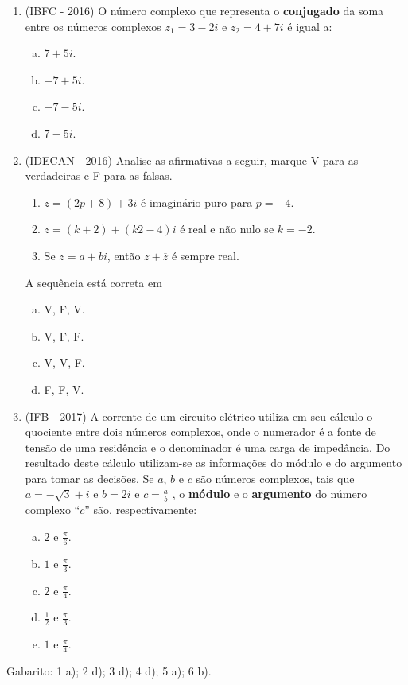 \begin{enumerate}
  \item (IBFC - 2016) O número complexo que representa o \textbf{conjugado} da soma entre os números complexos $z_1= 3 - 2i$ e $z_2 = 4 + 7i$ é igual a:
  \begin{enumerate}[a)]
  \item $7+5i$.
  \item $-7+5i$.
  \item $-7-5i$.
  \item $7-5i$.
  \end{enumerate}

  \item (IDECAN - 2016) Analise as afirmativas a seguir, marque V para as verdadeiras e F para as falsas.

   \begin{enumerate}[( \ \ )]
  \item $z = (2p + 8) + 3i$ é imaginário puro para $p = -4$.
  \item $z = (k + 2) + (k2 - 4)i$ é real e não nulo se $k = -2$.
  \item Se $z = a + bi$, então $z + \overline{z}$ é sempre real.
  \end{enumerate}
  A sequência está correta em
  \begin{enumerate}[a)]
  \item V, F, V.
  \item V, F, F.
  \item V, V, F.
  \item F, F, V.
  \end{enumerate}

   \item (IFB - 2017) A corrente de um circuito elétrico utiliza em seu cálculo o quociente entre dois números complexos, onde o numerador é a fonte de tensão de uma residência e o denominador é uma carga de impedância. Do resultado deste cálculo utilizam-se as informações do módulo e do argumento para tomar as decisões. Se $a$, $b$ e $c$ são números complexos, tais que $a = -\sqrt{3}+ i$ e $b = 2i$ e $c = \frac{a}{b}$ , o \textbf{módulo} e o \textbf{argumento} do número complexo “$c$” são, respectivamente:

  \begin{enumerate}[a)]
  \item $2$ e $\frac{\pi}{6}$.
  \item $1$ e $\frac{\pi}{3}$.
  \item $2$ e $\frac{\pi}{4}$.
  \item $\frac{1}{2}$ e $\frac{\pi}{3}$.
  \item $1$ e $\frac{\pi}{4}$.
  \end{enumerate}
 \end{enumerate}

 Gabarito: 1 a); 2 d); 3 d); 4 d); 5 a); 6 b).
